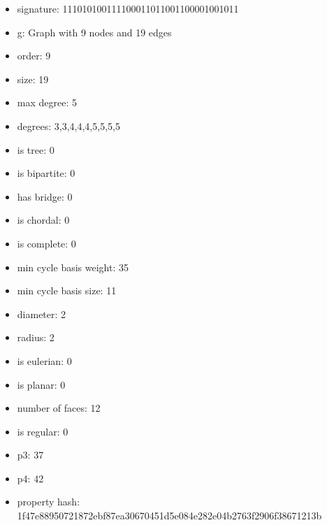 \newpage
\begin{figure}
\end{figure}
\begin{itemize}
\item signature: 111010100111100011011001100001001011
\item g: Graph with 9 nodes and 19 edges
\item order: 9
\item size: 19
\item max degree: 5
\item degrees: 3,3,4,4,4,5,5,5,5
\item is tree: 0
\item is bipartite: 0
\item has bridge: 0
\item is chordal: 0
\item is complete: 0
\item min cycle basis weight: 35
\item min cycle basis size: 11
\item diameter: 2
\item radius: 2
\item is eulerian: 0
\item is planar: 0
\item number of faces: 12
\item is regular: 0
\item p3: 37
\item p4: 42
\item property hash: 1f47e88950721872ebf87ea30670451d5e084e282e04b2763f2906f38671213b
\end{itemize}
